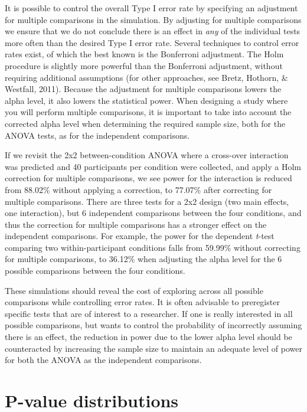 \documentclass[,jou, draftfirst, a4paper,floatsintext]{apa6}
\begin{document}
It is possible to control the overall Type I error rate by specifying an adjustment for multiple comparisons in the simulation.
By adjusting for multiple comparisons we ensure that we do not conclude there is an effect in \emph{any} of the individual tests more often than the desired Type I error rate.
Several techniques to control error rates exist, of which the best known is the Bonferroni adjustment.
The Holm procedure is slightly more powerful than the Bonferroni adjustment, without requiring additional assumptions (for other approaches, see Bretz, Hothorn, \& Westfall, 2011).
Because the adjustment for multiple comparisons lowers the alpha level, it also lowers the statistical power.
When designing a study where you will perform multiple comparisons, it is important to take into account the corrected alpha level when determining the required sample size, both for the ANOVA tests, as for the independent comparisons.

If we revisit the 2x2 between-condition ANOVA where a cross-over interaction was predicted and 40 participants per condition were collected, and apply a Holm correction for multiple comparisons, we see power for the interaction is reduced from 88.02\% without applying a correction, to 77.07\% after correcting for multiple comparisons.
There are three tests for a 2x2 design (two main effects, one interaction), but 6 independent comparisons between the four conditions, and thus the correction for multiple comparisons has a stronger effect on the independent comparisons.
For example, the power for the dependent \emph{t}-test comparing two within-participant conditions falls from 59.99\% without correcting for multiple comparisons, to 36.12\% when adjusting the alpha level for the 6 possible comparisons between the four conditions.

These simulations should reveal the cost of exploring across all possible comparisons while controlling error rates.
It is often advisable to preregister specific tests that are of interest to a researcher.
If one is really interested in all possible comparisons, but wants to control the probability of incorrectly assuming there is an effect, the reduction in power due to the lower alpha level should be counteracted by increasing the sample size to maintain an adequate level of power for both the ANOVA as the independent comparisons.

\hypertarget{p-value-distributions}{%
\section{P-value distributions}\label{p-value-distributions}}
\end{document}
